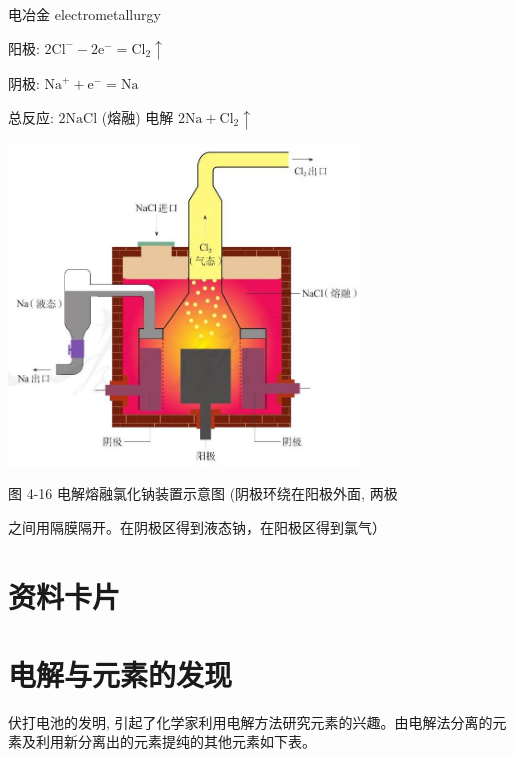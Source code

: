 \documentclass[10pt]{article}
\begin{document}
\begin{mdframed}

电冶金 electrometallurgy

\end{mdframed}

阳极: \(2{\mathrm{{Cl}}}^{ - } - 2{\mathrm{e}}^{ - } = {\mathrm{{Cl}}}_{2} \uparrow\)

阴极: \({\mathrm{{Na}}}^{ + } + {\mathrm{e}}^{ - } = \mathrm{{Na}}\)

总反应: \(2\mathrm{{NaCl}}\) (熔融) 电解 \(2\mathrm{{Na}} + {\mathrm{{Cl}}}_{2} \uparrow\)

\begin{center}
\includegraphics[max width=0.7\textwidth]{images/0190da9d-8bfd-732f-bc2c-0b21d0f13b91_113_179327.jpg}
\end{center}

图 4-16 电解熔融氯化钠装置示意图 (阴极环绕在阳极外面, 两极

之间用隔膜隔开。在阴极区得到液态钠，在阳极区得到氯气）

\section*{资料卡片}

\section*{电解与元素的发现}

伏打电池的发明, 引起了化学家利用电解方法研究元素的兴趣。由电解法分离的元素及利用新分离出的元素提纯的其他元素如下表。
\end{document}
